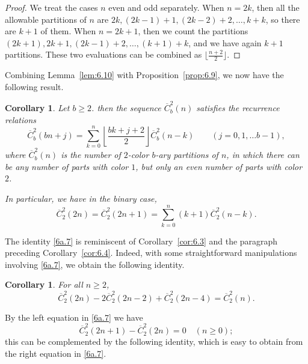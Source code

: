 \documentclass{amsart}
\theoremstyle{plain}
\newtheorem{corollary}[theorem]{Corollary}
\numberwithin{equation}{section}
\begin{document}
\begin{proof}
We treat the cases $n$ even and odd separately. When $n=2k$, then all the
allowable partitions of $n$ are $2k, (2k-1)+1, (2k-2)+2, \ldots, k+k$, so there
are $k+1$ of them. When $n=2k+1$, then we count the partitions
$(2k+1), 2k+1, (2k-1)+2, \ldots, (k+1)+k$, and we have again $k+1$ partitions.
These two evaluations can be combined as $\lfloor\frac{n+2}{2}\rfloor$.
\end{proof} 

Combining Lemma~\ref{lem:6.10} with Proposition~\ref{prop:6.9}, we now have the
following result.

\begin{corollary}\label{cor:6.11}
Let $b\geq 2$. then the sequence $\overline{C}_b^2(n)$ satisfies the recurrence
relations 
\begin{equation}\label{6a.6}
\overline{C}_b^2(bn+j)
=\sum_{k=0}^n\left\lfloor\frac{bk+j+2}{2}\right\rfloor\overline{C}_b^2(n-k) 
\qquad (j=0, 1,\ldots b-1),
\end{equation}
where $\overline{C}_b^2(n)$ is the number of $2$-color $b$-ary partitions of
$n$, in which there can be any number of parts with color $1$, but only an 
even number of parts with color $2$.

In particular, we have in the binary case,
\begin{equation}\label{6a.7}
\overline{C}_2^2(2n)=\overline{C}_2^2(2n+1)
=\sum_{k=0}^n(k+1)\overline{C}_2^2(n-k).
\end{equation}
\end{corollary}

The identity \eqref{6a.7} is reminiscent of Corollary~\ref{cor:6.3} and the
paragraph preceding Corollary~\ref{cor:6.4}. Indeed, with some straightforward
manipulations involving \eqref{6a.7}, we obtain the following identity.

\begin{corollary}\label{cor:6.12}
For all $n\geq 2$,
\begin{equation}\label{6a.8}
\overline{C}_2^2(2n)-2\overline{C}_2^2(2n-2)+\overline{C}_2^2(2n-4)
=\overline{C}_2^2(n).
\end{equation}
\end{corollary}

By the left equation in \eqref{6a.7} we have 
\begin{equation}\label{6a.8a}
\overline{C}_2^2(2n+1)-\overline{C}_2^2(2n)=0\quad (n\geq 0);
\end{equation}
this can be complemented by the following identity, which is easy to obtain 
from the right equation in \eqref{6a.7}.
\end{document}
